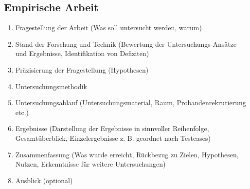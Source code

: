 \subsection{Empirische Arbeit}\label{subsec:a3}

\begin{enumerate}
    \item{Fragestellung der Arbeit (Was soll untersucht werden, warum)}
    \item{Stand der Forschung und Technik (Bewertung der Untersuchungs-Ansätze und Ergebnisse, Identifikation von Defiziten)}
    \item{Präzisierung der Fragestellung (Hypothesen)}
    \item{Untersuchungsmethodik }
    \item{Untersuchungsablauf (Untersuchungsmaterial, Raum, Probandenrekrutierung etc.)}
    \item{Ergebnisse (Darstellung der Ergebnisse in sinnvoller  Reihenfolge, Gesamtüberblick, Einzelergebnisse z. B. geordnet nach Testcases)}
    \item{Zusammenfassung (Was wurde erreicht, Rückbezug zu Zielen, Hypothesen, Nutzen, Erkenntnisse für weitere Untersuchungen)}
    \item{Ausblick (optional)}
\end{enumerate}
